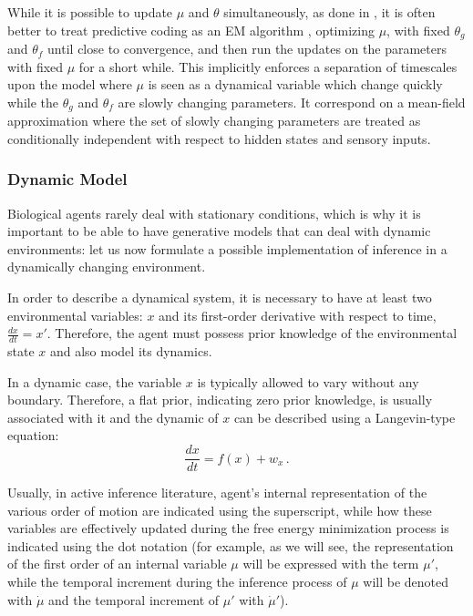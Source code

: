 \documentclass[10pt]{article}
\begin{document}
While it is possible to update $\mu$ and $\theta$ simultaneously, as done in \citep{Rao1999}, it is often better to treat predictive coding as an EM algorithm \citep{Dempster1977}, optimizing $\mu$, with fixed $\theta_g$ and $\theta_f$ until close to convergence, and then run the updates on the parameters with fixed $\mu$ for a short while. 
This implicitly enforces a separation of timescales upon the model where $\mu$ is seen as a dynamical variable which change quickly while the $\theta_g$ and $\theta_f$ are slowly changing parameters. It correspond on a mean-field approximation where the set of slowly changing parameters are treated as conditionally independent with respect to hidden states and sensory inputs. 

\subsubsection{Dynamic Model}
Biological agents rarely deal with stationary conditions, which is why it is important to be able to have generative models that can deal with dynamic environments: let us now formulate a possible implementation of inference in a dynamically changing environment.

In order to describe a dynamical system, it is necessary to have at least two environmental variables: $x$ and its first-order derivative with respect to time, $\frac{dx}{dt} = x'$. Therefore, the agent must possess prior knowledge of the environmental state $x$ and also model its dynamics.

In a dynamic case, the variable $x$ is typically allowed to vary without any boundary. Therefore, a flat prior, indicating zero prior knowledge, is usually associated with it and the dynamic of $x$ can be described using a Langevin-type equation:
\begin{equation}
\frac{d x}{dt} = f(x) + w_{x} \, .
\label{eq:fx}
\end{equation}

Usually, in active inference literature, agent's internal representation of the various order of motion are indicated using the superscript, while how these variables are effectively updated during the free energy minimization process is indicated using the dot notation (for example, as we will see, the representation of the first order of an internal variable $\mu$ will be expressed with the term $\mu'$, while the temporal increment during the inference process of $\mu$ will be denoted with $\dot{\mu}$ and the temporal increment of $\mu'$ with $\dot{\mu}'$).
\end{document}
